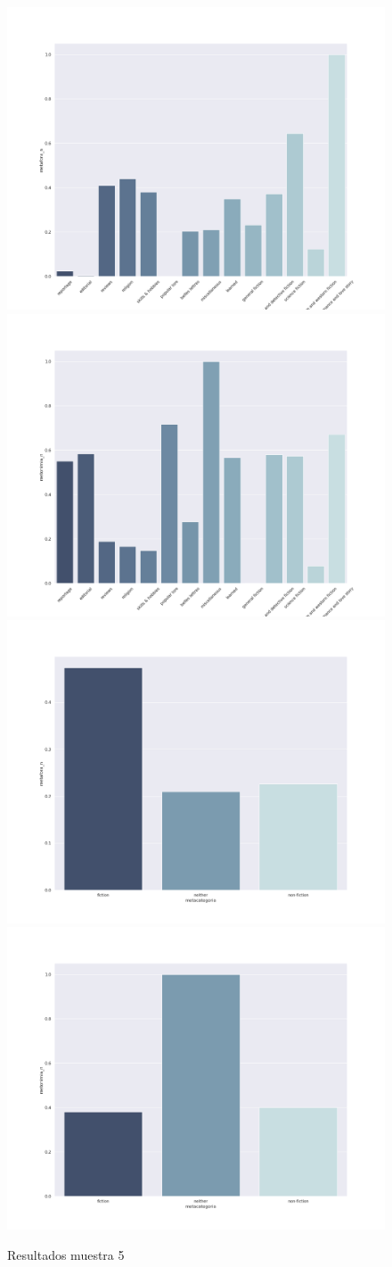 \documentclass[twoside]{article}
\begin{document}
\begin{figure}[!H]
\centering
\includegraphics[width=.45\linewidth]{./resultados/graphs/muestra/c5_metafora.png}
\includegraphics[width=.45\linewidth]{./resultados/graphs/muestra/c5_metonimia.png}
\includegraphics[width=.45\linewidth]{./resultados/graphs/meta/c5_metacategoria_metafora.png}
\includegraphics[width=.45\linewidth]{./resultados/graphs/meta/c5_metacategoria_metonimia.png}
\caption{\label{fig:c5_resultados}Resultados muestra 5}
\end{figure}
\end{document}
